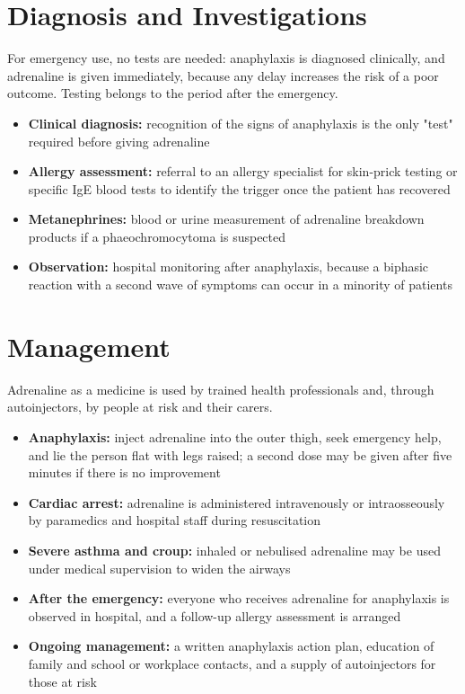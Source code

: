 \section*{Diagnosis and Investigations}
For emergency use, no tests are needed: anaphylaxis is diagnosed clinically, and adrenaline is given immediately, because any delay increases the risk of a poor outcome. Testing belongs to the period after the emergency.

\begin{itemize}
    \item \textbf{Clinical diagnosis:} recognition of the signs of anaphylaxis is the only "test" required before giving adrenaline
    \item \textbf{Allergy assessment:} referral to an allergy specialist for skin-prick testing or specific IgE blood tests to identify the trigger once the patient has recovered
    \item \textbf{Metanephrines:} blood or urine measurement of adrenaline breakdown products if a phaeochromocytoma is suspected
    \item \textbf{Observation:} hospital monitoring after anaphylaxis, because a biphasic reaction with a second wave of symptoms can occur in a minority of patients
\end{itemize}

\section*{Management}
Adrenaline as a medicine is used by trained health professionals and, through autoinjectors, by people at risk and their carers.

\begin{itemize}
    \item \textbf{Anaphylaxis:} inject adrenaline into the outer thigh, seek emergency help, and lie the person flat with legs raised; a second dose may be given after five minutes if there is no improvement
    \item \textbf{Cardiac arrest:} adrenaline is administered intravenously or intraosseously by paramedics and hospital staff during resuscitation
    \item \textbf{Severe asthma and croup:} inhaled or nebulised adrenaline may be used under medical supervision to widen the airways
    \item \textbf{After the emergency:} everyone who receives adrenaline for anaphylaxis is observed in hospital, and a follow-up allergy assessment is arranged
    \item \textbf{Ongoing management:} a written anaphylaxis action plan, education of family and school or workplace contacts, and a supply of autoinjectors for those at risk
\end{itemize}

